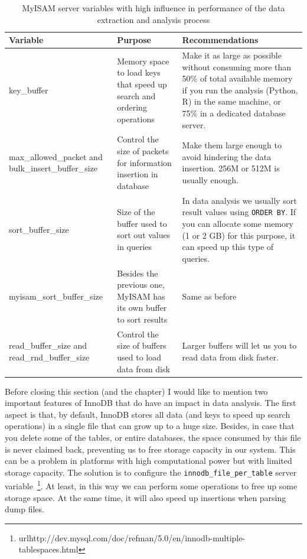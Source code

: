 \begin{longtable}[l]{|m{4.5cm}|m{5cm}|m{5cm}|}
 \caption[MyISAM server variables]
  {MyISAM server variables with high influence in performance of the data extraction
  and analysis process}
  \label{tab:myisam-vars}\\
  \hline
  {\bfseries Variable} & {\bfseries Purpose} & {\bfseries Recommendations}\\
  \hline
  key\_buffer & Memory space to load keys that speed up search and ordering operations & Make
  it as large as possible without consuming more than 50\% of total available memory if you
  run the analysis (Python, R) in the same machine, or 75\% in a dedicated database server.\\
  \hline
  max\_allowed\_packet and bulk\_insert\_buffer\_size & Control the size of packets for information
  insertion in database & Make them large enough to avoid hindering the data insertion. 256M
  or 512M is usually enough.\\
  \hline
  sort\_buffer\_size & Size of the buffer used to sort out values in queries & In data analysis
  we usually sort result values using \texttt{ORDER BY}. If you can allocate some memory
  (1 or 2 GB) for this purpose, it can speed up this type of queries.\\
  \hline
  myisam\_sort\_buffer\_size & Besides the previous one, MyISAM has its own buffer to sort results &
  Same as before\\
  \hline
  read\_buffer\_size and read\_rnd\_buffer\_size & Control the size of buffers used to load data
  from disk & Larger buffers will let us you to read data from disk faster.\\
  \hline
\end{longtable}

Before closing this section (and the chapter) I would like to mention two important
features of InnoDB that do have an impact in data analysis. The first aspect is that,
by default, InnoDB stores all data (and keys to speed up search operations) in a single
file that can grow up to a huge size. Besides, in case that you delete some of the
tables, or entire databases, the space consumed by this file is never claimed back,
preventing us to free storage capacity in our system. This can be a problem in
platforms with high computational power but with limited storage capacity. The solution
is to configure the \texttt{innodb\_file\_per\_table} server 
variable~\footnote{url{http://dev.mysql.com/doc/refman/5.0/en/innodb-multiple-tablespaces.html}}.
At least, in this way we can perform some operations to free up some storage space. At
the same time, it will also speed up insertions when parsing dump files.

